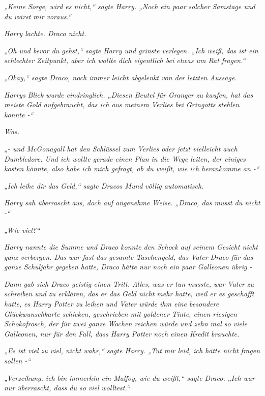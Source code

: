 {\emph{„Keine Sorge, wird es nicht,“ sagte Harry. „Noch ein paar} \emph{\emph{solcher}} \emph{Samstage und du wärst} \emph{\emph{mir}} \emph{voraus.“}

\emph{Harry lachte. Draco nicht.}

\emph{„Oh und bevor du gehst,“ sagte Harry und grinste verlegen. „Ich weiß, das ist ein schlechter Zeitpunkt, aber ich wollte dich eigentlich bei etwas um Rat fragen.“}

\emph{„Okay,“ sagte Draco, noch immer leicht abgelenkt von der letzten Aussage.}

\emph{Harrys} \emph{Blick} \emph{wurde eindringlich. „Diesen Beutel für Granger zu kaufen, hat das meiste Gold aufgebraucht, das ich aus meinem Verlies bei Gringotts stehlen konnte -“}

\emph{Was.}

\emph{„- und McGonagall hat den Schlüssel zum Verlies oder jetzt vielleicht auch Dumbledore. Und ich wollte gerade einen Plan in die Wege leiten, der einiges kosten könnte, also habe ich mich gefragt, ob du weißt, wie ich herankomme an -“}

\emph{„Ich leihe dir das Geld,“ sagte Dracos Mund} \emph{völlig automatisch.}

\emph{Harry sah überrascht aus, doch auf angenehme Weise. „Draco, das musst du nicht -“}

\emph{„Wie viel?“}

\emph{Harry nannte die Summe und Draco konnte den Schock auf seinem Gesicht nicht ganz verbergen. Das war fast das gesamte Taschengeld, das Vater Draco für das ganze Schuljahr gegeben hatte, Draco hätte nur noch ein paar Galleonen übrig -}

\emph{Dann gab sich Draco geistig einen Tritt. Alles, was er tun musste, war Vater zu schreiben und zu erklären, das er das Geld nicht mehr hatte, weil er es geschafft hatte,} \emph{\emph{es Harry Potter zu leihen}} \emph{und Vater würde ihm eine besondere Glückwunschkarte schicken, geschrieben mit goldener Tinte, einen riesigen Schokofrosch, der für zwei ganze Wochen reichen würde und zehn mal so viele Galleonen, nur für den Fall, dass Harry Potter noch einen Kredit brauchte.}

\emph{„Es ist viel zu viel, nicht wahr,“ sagte Harry. „Tut mir leid, ich hätte nicht fragen sollen -“}

\emph{„Verzeihung, ich} \emph{\emph{bin}} \emph{immerhin ein Malfoy, wie du weißt,“ sagte Draco. „Ich war nur überrascht, dass du so viel} \emph{\emph{wolltest.}“}

}

